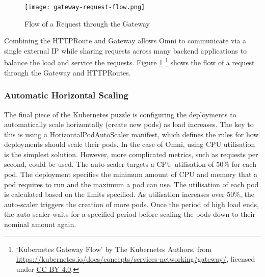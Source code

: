 \begin{figure}[htbp]
\texttt{[image: gateway-request-flow.png]}
\centering
\caption{Flow of a Request through the Gateway}
\label{fig:k8s-gateway-flow}
\end{figure}

Combining the HTTPRoute and Gateway allows Omni to communicate via a single external IP while sharing requests across many backend applications to balance the load and service the requests.
Figure \ref{fig:k8s-gateway-flow} \footnote{`Kubernetes Gateway Flow' by The Kubernetes Authors, from \url{https://kubernetes.io/docs/concepts/services-networking/gateway/}, licensed under \href{https://creativecommons.org/licenses/by/4.0/}{CC BY 4.0}.} shows the flow of a request through the Gateway and HTTPRoutes.

\subsubsection{Automatic Horizontal Scaling}
The final piece of the Kubernetes puzzle is configuring the deployments to automatically scale horizontally (create new pods) as load increases.
The key to this is using a \underline{\href{https://kubernetes.io/docs/tasks/run-application/horizontal-pod-autoscale/}{HorizontalPodAutoScaler}} \nocite{horizontalpodautoscaler} manifest, which defines the rules for how deployments should scale their pods.
In the case of Omni, using CPU utilisation is the simplest solution. However, more complicated metrics, such as requests per second, could be used.
The auto-scaler targets a CPU utilisation of 50\% for each pod. The deployment specifies the minimum amount of CPU and memory that a pod requires to run and the maximum a pod can use.
The utilisation of each pod is calculated based on the limits specified.
As utilisation increases over 50\%, the auto-scaler triggers the creation of more pods.
Once the period of high load ends, the auto-scaler waits for a specified period before scaling the pods down to their nominal amount again.

